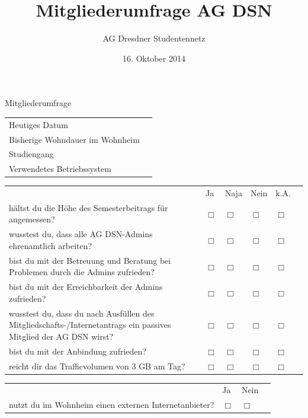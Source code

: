 \documentclass[a4paper,10pt]{scrreprt}
\title{Mitgliederumfrage AG DSN}
\author{AG Dresdner Studentennetz}
\date{16. Oktober 2014}
\renewcommand{\vertikalblocktwo}[3]{\vspace{0.1cm}\begin{tabular}{p{10cm}p{2cm}p{2cm}p{0.001cm}}&\centering #1&\centering #2&\\#3\end{tabular}\vspace{0.5cm}}
\renewcommand{\blocktexttwo}[1]{#1\vspace{0.2cm}& \centering$\Box$ & \centering$\Box$&\\}
\renewcommand{\vertikalblockfour}[5]{\vspace{0.1cm}\begin{tabular}{p{10cm}p{1cm}p{1cm}p{1cm}p{1cm}p{0.001cm}}&\centering #1&\centering #2&\centering #3&\centering #4&\\#5\end{tabular}\vspace{0.5cm}}
\renewcommand{\blocktextfour}[1]{#1\vspace{0.2cm}& \centering$\Box$ & \centering$\Box$ & \centering$\Box$ & \centering$\Box$&\\}
\renewcommand{\longline}{\raisebox{-3mm}{\parbox{8cm}{\hrule\strut}}}
\renewenvironment{answersA}{\vspace{0.25cm}\begin{addmargin}[0cm]{4cm}\begin{compactitem}[]}{\end{compactitem}\end{addmargin}}
\begin{document}
    \thispagestyle{fancy}
    \renewcommand{\headrulewidth}{0pt}
    \renewcommand{\footrulewidth}{0pt}
    \setlength\headheight{40.0pt}
    \addtolength{\textheight}{-70.0pt}
    \cfoot{}

    {\huge Mitgliederumfrage}

    \begin{answersA}
        \item{}
        \item{}
        \item{}
        \item{}
        \item{}\vspace{.25cm}
        \item{}
    \end{answersA}

    \begin{tabular}{ p{6cm} l }
        Heutiges Datum & \longline \\
        Bisherige Wohndauer im Wohnheim & \longline \\
        Studiengang & \longline \\
        Verwendetes Betriebssystem & \longline
    \end{tabular}

    \vertikalblockfour{Ja}{Naja}{Nein}{k.A.}{
        \blocktextfour{hältst du die Höhe des Semesterbeitrags für angemessen?}
        \blocktextfour{wusstest du, dass alle AG DSN-Admins ehrenamtlich arbeiten?}
        \blocktextfour{bist du mit der Betreuung und Beratung bei Problemen
        durch die Admins zufrieden?}
        \blocktextfour{bist du mit der Erreichbarkeit der Admins zufrieden?}
        \blocktextfour{wusstest du, dass du nach Ausfüllen des
        Mitgliedschafts-/Internetantrags ein passives Mitglied der AG DSN wirst?}
        \blocktextfour{bist du mit der Anbindung zufrieden?}
        \blocktextfour{reicht dir das Trafficvolumen von 3 GB am Tag?}
    }

    \vertikalblocktwo{Ja}{Nein}{
        \blocktexttwo{nutzt du im Wohnheim einen externen Internetanbieter?}
    }

    \opentwo
\end{document}
